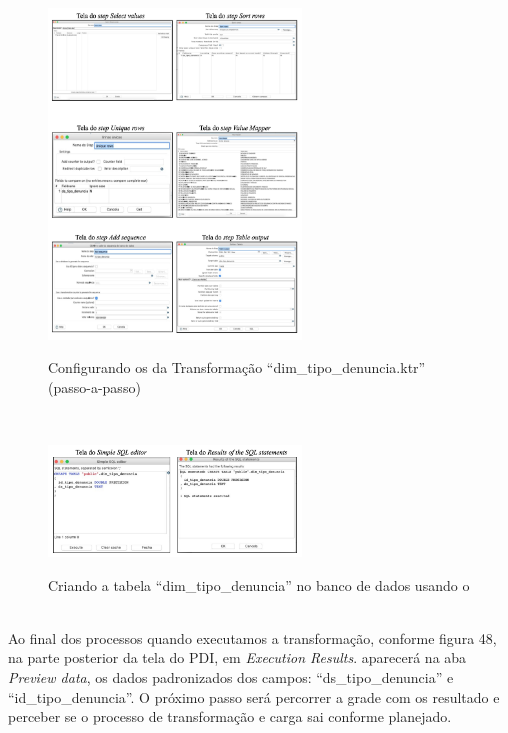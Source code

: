 \begin{figure}[H]
	\vspace*{0,2cm}
    \centering
    \caption{Configurando os  da Transforma\c{c}\~{a}o ``dim\_tipo\_denuncia.ktr'' (passo-a-passo)}
    \includegraphics[width=0.6\textwidth]{./04-figuras/figura-dim-tipo-denuncia-passo-a-passo}
    \label{fig:ilustfigrdimtipodenunciapassoapasso}
\end{figure}
\vspace*{-0,9cm}
{\raggedright {}} \\

\begin{figure}[H]
	\vspace*{0,2cm}
    \centering
    \caption{Criando a tabela ``dim\_tipo\_denuncia'' no banco de dados usando o }
    \includegraphics[width=0.6\textwidth]{./04-figuras/figura-tb-dim-tipo-denuncia}
    \label{fig:ilustfigtbdimtipodenuncia}
\end{figure}
\vspace*{-0,9cm}
{\raggedright {}} \\

Ao final dos processos quando executamos a transforma\c{c}\~{a}o, conforme figura 48, na parte posterior da tela do PDI, em \textit{Execution Results}. aparecer\'{a} na aba \textit{Preview data}, os dados padronizados dos campos: ``ds\_tipo\_denuncia'' e ``id\_tipo\_denuncia''. O pr\'oximo passo ser\'{a} percorrer a grade com os resultado e perceber se o processo de transforma\c{c}\~{a}o e carga sai conforme planejado. 

